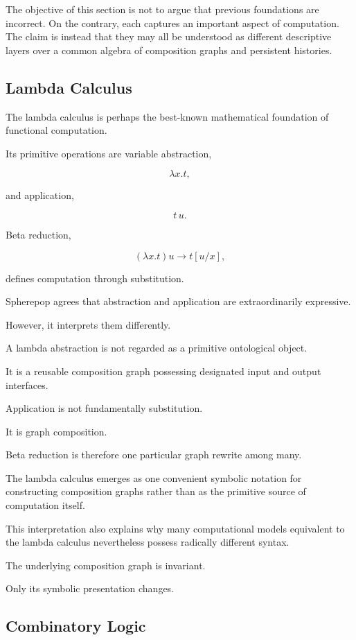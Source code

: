 \documentclass[12pt,oneside]{article}
\begin{document}
The objective of this section is not to argue that previous foundations are incorrect. On the contrary, each captures an important aspect of computation. The claim is instead that they may all be understood as different descriptive layers over a common algebra of composition graphs and persistent histories.

\subsection{Lambda Calculus}

The lambda calculus is perhaps the best-known mathematical foundation of functional computation.

Its primitive operations are variable abstraction,

\[
\lambda x.t,
\]

and application,

\[
t\,u.
\]

Beta reduction,

\[
(\lambda x.t)u
\longrightarrow
t[u/x],
\]

defines computation through substitution.

Spherepop agrees that abstraction and application are extraordinarily expressive.

However, it interprets them differently.

A lambda abstraction is not regarded as a primitive ontological object.

It is a reusable composition graph possessing designated input and output interfaces.

Application is not fundamentally substitution.

It is graph composition.

Beta reduction is therefore one particular graph rewrite among many.

The lambda calculus emerges as one convenient symbolic notation for constructing composition graphs rather than as the primitive source of computation itself.

This interpretation also explains why many computational models equivalent to the lambda calculus nevertheless possess radically different syntax.

The underlying composition graph is invariant.

Only its symbolic presentation changes.

\subsection{Combinatory Logic}
\end{document}
